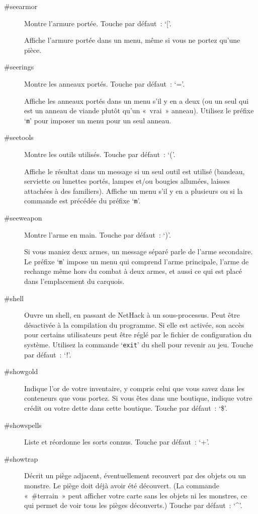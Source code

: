\documentclass[titlepage]{article}
\begin{document}
\begin{description}
\item[{\#seearmor}]
Montre l'armure portée.
Touche par défaut~: `['.


Affiche l'armure portée dans un menu, même si vous ne portez qu'une
pièce.

\item[{\#seerings}]
Montre les anneaux portés.
Touche par défaut~: `='.


Affiche les anneaux portés dans un menu s'il y en a deux (ou un seul
qui est un anneau de viande plutôt qu'un «~vrai~» anneau).
Utilisez le préfixe `\texttt{m}' pour imposer un menu pour un seul
anneau.

\item[{\#seetools}]
Montre les outils utilisés.
Touche par défaut~: `('.


Affiche le résultat dans un message si un seul outil est utilisé (bandeau,
serviette ou lunettes portés, lampes et/ou bougies allumées, laisses
attachées à des familiers).
Affiche un menu s'il y en a plusieurs ou si la commande est précédée du
préfixe `\texttt{m}'.

\item[{\#seeweapon}]
Montre l'arme en main.
Touche par défaut~: `)'.


Si vous maniez deux armes, un message séparé parle de l'arme secondaire.
Le préfixe `\texttt{m}' impose un menu qui comprend l'arme principale,
l'arme de rechange même hors du combat à deux armes, et aussi ce qui est
placé dans l'emplacement du carquois.

\item[{\#shell}]
Ouvre un shell, en passant de NetHack à un sous-processus.
Peut être désactivée à la compilation du programme.
Si elle est activée, son accès pour certains utilisateurs peut être réglé
par le fichier de configuration du système.
Utilisez la commande `\texttt{exit}' du shell pour revenir au jeu.
Touche par défaut~: `!'.

\item[{\#showgold}]
Indique l'or de votre inventaire, y compris celui que vous savez dans les
conteneurs que vous portez.
Si vous êtes dans une boutique, indique votre crédit ou votre dette dans
cette boutique.
Touche par défaut~: `\$'.

\item[{\#showspells}]
Liste et réordonne les sorts connus.
Touche par défaut~: `+'.

\item[{\#showtrap}]
Décrit un piège adjacent, éventuellement recouvert par des objets ou un
monstre.
Le piège doit déjà avoir été découvert.
(La commande «~\#terrain~» peut afficher votre carte sans les objets
ni les monstres, ce qui permet de voir tous les pièges découverts.)
Touche par défaut~: `\textasciicircum{}'. 


\end{description}
\end{document}
